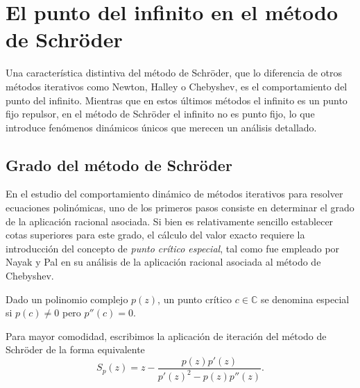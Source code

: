 

\section{El punto del infinito en el método de Schröder}

Una característica distintiva del método de Schröder, que lo diferencia de otros métodos iterativos como Newton, Halley o Chebyshev, es el comportamiento del punto del infinito. Mientras que en estos últimos métodos el infinito es un punto fijo repulsor, en el método de Schröder el infinito no es punto fijo, lo que introduce fenómenos dinámicos únicos que merecen un análisis detallado.

\subsection{Grado del método de Schröder}

En el estudio del comportamiento dinámico de métodos iterativos para resolver ecuaciones polinómicas, uno de los primeros pasos consiste en determinar el grado de la aplicación racional asociada. Si bien es relativamente sencillo establecer cotas superiores para este grado, el cálculo del valor exacto requiere la introducción del concepto de \emph{punto crítico especial}, tal como fue empleado por Nayak y Pal en su análisis de la aplicación racional asociada al método de Chebyshev.

\begin{definition}
Dado un polinomio complejo $p(z)$, un punto crítico $c\in\mathbb{C}$ se denomina especial si $p(c)\ne 0$ pero $p''(c) = 0$.
\end{definition}

Para mayor comodidad, escribimos la aplicación de iteración del método de Schröder de la forma equivalente
\begin{equation}
S_p(z)=z -\frac{p(z)p'(z)}{p'(z)^2- p(z)p''(z)}.
\label{eq:sch_alt_form}
\end{equation}

